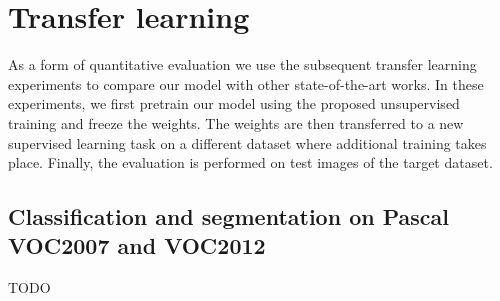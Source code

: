\documentclass[a4paper,12pt]{report}
\begin{document}




\section{Transfer learning} %
As a form of quantitative evaluation we use the subsequent transfer learning experiments to compare our model with other state-of-the-art works. In these experiments, we first pretrain our model using the proposed unsupervised training and freeze the weights. The weights are then transferred to a new supervised learning task on a different dataset where additional training takes place. Finally, the evaluation is performed on test images of the target dataset.

\subsection{Classification and segmentation on Pascal VOC2007 and VOC2012}\label{subsec:tl_exp_pascalvoc}
TODO
\end{document}

